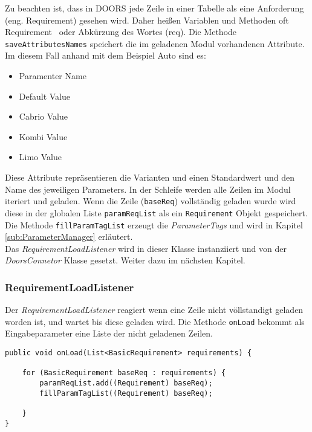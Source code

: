 Zu beachten ist, dass in DOORS jede Zeile in einer Tabelle als eine Anforderung (eng. Requirement) gesehen wird. Daher heißen Variablen und Methoden oft \glqq Requirement\grqq~ oder Abkürzung des Wortes (req). Die Methode \texttt{saveAttributesNames} speichert die im geladenen Modul vorhandenen Attribute. Im diesem Fall anhand mit dem Beispiel Auto sind es:

\begin{itemize}\itemsep1pt
\item Paramenter Name
\item Default Value
\item Cabrio Value
\item Kombi Value
\item Limo Value
\end{itemize}

Diese Attribute repräsentieren die Varianten und einen Standardwert und den Name des jeweiligen Parameters. In der Schleife werden alle Zeilen im Modul iteriert und geladen. Wenn die Zeile (\texttt{baseReq}) vollständig geladen wurde wird diese in der globalen Liste \texttt{paramReqList} als ein \texttt{Requirement} Objekt gespeichert. Die Methode \texttt{fillParamTagList} erzeugt die \textit{ParameterTags} und wird in Kapitel \ref{sub:ParameterManager} erläutert.\\

Das \textit{RequirementLoadListener} wird in dieser Klasse instanziiert und von der \textit{DoorsConnetor} Klasse gesetzt. Weiter dazu im nächsten Kapitel.


\subsubsection{RequirementLoadListener}\label{sub.RequirementLoadListener}
Der \textit{RequirementLoadListener} reagiert wenn eine Zeile nicht völlstandigt geladen worden ist, und wartet bis diese geladen wird. Die Methode \texttt{onLoad} bekommt als Eingabeparameter eine Liste der nicht geladenen Zeilen.

\begin{lstlisting}[caption={Nachladen der Parametertabelle nach Zeilen}, captionpos=b]
public void onLoad(List<BasicRequirement> requirements) {

	for (BasicRequirement baseReq : requirements) {
		paramReqList.add((Requirement) baseReq);
		fillParamTagList((Requirement) baseReq);
		
	}
}
\end{lstlisting}

